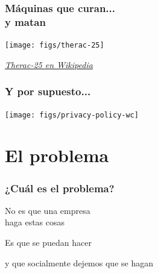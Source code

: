 \documentclass[17pt,aspectratio=169]{beamer}
\begin{document}
\begin{frame}[fragile]
\frametitle{Máquinas que curan... \\ y matan}

  \begin{center}
  \texttt{[image: figs/therac-25]}
  \end{center}

  \begin{flushright}
    {\em \tiny
      \href{https://en.wikipedia.org/wiki/Therac-25}{Therac-25 en Wikipedia}}
  \end{flushright}
  
\end{frame}


\begin{frame}
\frametitle{Y por supuesto...}

\begin{center}
\texttt{[image: figs/privacy-policy-wc]}
\end{center}

\end{frame}

\section{El problema}


\begin{frame}
\frametitle{¿Cuál es el problema?}

{\large
\begin{center}
No es que una empresa \\
haga estas cosas
\pause
\vspace{1cm}

Es que se puedan hacer
\pause
\vspace{1cm}

y que socialmente dejemos que se hagan
\end{center}
}
\end{frame}



\end{document}
